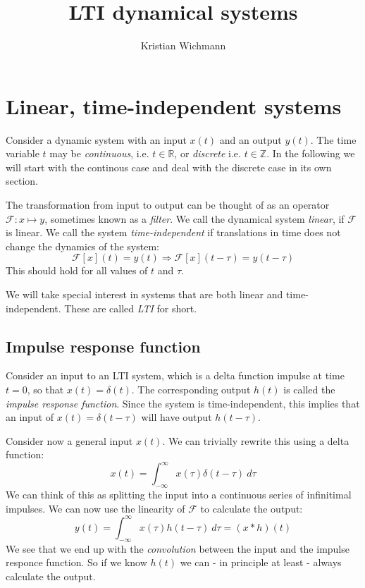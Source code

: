 \documentclass[12pt, a4paper]{article}
\title{LTI dynamical systems}
\author{Kristian Wichmann}
\numberwithin{equation}{section}
\begin{document}
\maketitle

\section{Linear, time-independent systems}
Consider a dynamic system with an input $x(t)$ and an output $y(t)$. The time variable $t$ may be \textit{continuous}, i.e. $t\in\mathbb{R}$, or \textit{discrete} i.e. $t\in\mathbb{Z}$. In the following we will start with the continous case and deal with the discrete case in its own section.

The transformation from input to output can be thought of as an operator $\mathcal{F}:x\mapsto y$, sometimes known as a \textit{filter}. We call the dynamical system \textit{linear}, if $\mathcal{F}$ is linear. We call the system \textit{time-independent} if translations in time does not change the dynamics of the system:
\begin{equation}
\mathcal{F}[x](t)=y(t)\Rightarrow\mathcal{F}[x](t-\tau)=y(t-\tau)
\end{equation}
This should hold for all values of $t$ and $\tau$.

We will take special interest in systems that are both linear and time-independent. These are called \textit{LTI} for short.

\subsection{Impulse response function}
Consider an input to an LTI system, which is a delta function impulse at time $t=0$, so that $x(t)=\delta(t)$. The corresponding output $h(t)$ is called the \textit{impulse response function}. Since the system is time-independent, this implies that an input of $x(t)=\delta(t-\tau)$ will have output $h(t-\tau)$.

Consider now a general input $x(t)$. We can trivially rewrite this using a delta function:
\begin{equation}
x(t)=\int_{-\infty}^\infty x(\tau)\delta(t-\tau)\ d\tau
\end{equation}
We can think of this as splitting the input into a continuous series of infinitimal impulses. We can now use the linearity of $\mathcal{F}$ to calculate the output:
\begin{equation}
y(t)=\int_{-\infty}^\infty x(\tau)h(t-\tau)\ d\tau=(x*h)(t)
\end{equation}
We see that we end up with the \textit{convolution} between the input and the impulse responce function. So if we know $h(t)$ we can - in principle at least - always calculate the output.
\end{document}
